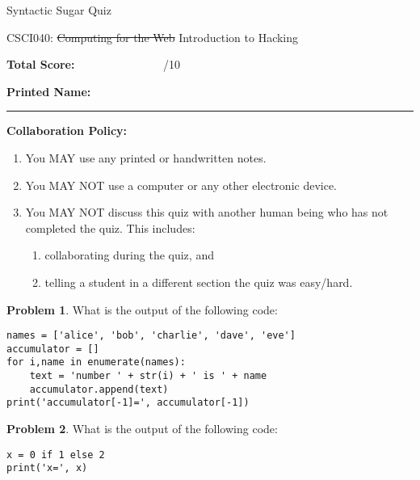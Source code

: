 \documentclass[10pt]{article}
\theoremstyle{definition}
\newtheorem{problem}{Problem}
\begin{document}
\begin{center}
    {
\Large
    Syntactic Sugar Quiz
}

    \vspace{0.1in}
    CSCI040: \sout{Computing for the Web} Introduction to Hacking

    \vspace{0.1in}
\end{center}


\vspace{0.15in}
\noindent
\textbf{Total Score:} ~~~~~~~~~~~~~~~/10

\vspace{0.5in}
\noindent
\textbf{Printed Name:}

\noindent
\rule{\textwidth}{0.1pt}
\vspace{0.25in}

\noindent
\textbf{Collaboration Policy:}
\begin{enumerate}
    \item You MAY use any printed or handwritten notes.
    \item You MAY NOT use a computer or any other electronic device.
    \item You MAY NOT discuss this quiz with another human being who has not completed the quiz.
        This includes:
        \begin{enumerate}
            \item collaborating during the quiz, and
            \item telling a student in a different section the quiz was easy/hard.
        \end{enumerate}
\end{enumerate}

\vspace{0.15in}

\begin{problem}
    What is the output of the following code:
\end{problem}
\begin{lstlisting}
names = ['alice', 'bob', 'charlie', 'dave', 'eve']
accumulator = []
for i,name in enumerate(names):
    text = 'number ' + str(i) + ' is ' + name
    accumulator.append(text)
print('accumulator[-1]=', accumulator[-1])
\end{lstlisting}
\vspace{1.5in}

\begin{problem}
    What is the output of the following code:
\end{problem}
\begin{lstlisting}
x = 0 if 1 else 2
print('x=', x)
\end{lstlisting}
\vspace{1.5in}
\end{document}
